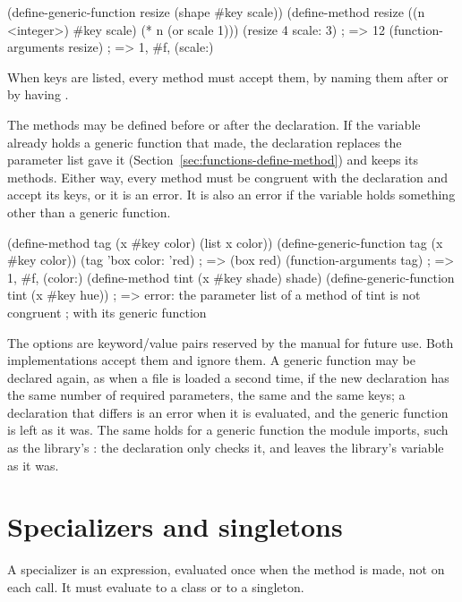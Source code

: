 \begin{dylan}
(define-generic-function resize (shape #key scale))
(define-method resize ((n <integer>) #key scale)
  (* n (or scale 1)))
(resize 4 scale: 3)            ; => 12
(function-arguments resize)    ; => 1, #f, (scale:)
\end{dylan}

\noindent When keys are listed, every method must accept them, by naming
them after  or by having .

The methods may be defined before or after the declaration. If the variable
already holds a generic function that  made, the
declaration replaces the parameter list  gave it
(Section~\ref{sec:functions-define-method}) and keeps its methods. Either
way, every method must be congruent with the declaration and accept its
keys, or it is an error. It is also an error if the variable holds something
other than a generic function.

\begin{dylan}
(define-method tag (x #key color) (list x color))
(define-generic-function tag (x #key color))
(tag 'box color: 'red)         ; => (box red)
(function-arguments tag)       ; => 1, #f, (color:)
(define-method tint (x #key shade) shade)
(define-generic-function tint (x #key hue))
; => error: the parameter list of a method of tint is not congruent
;    with its generic function
\end{dylan}

The options are keyword/value pairs reserved by the manual for future use.
Both implementations accept them and ignore them. A generic function may
be declared again, as when a file is loaded a second time, if the new
declaration has the same number of required parameters, the same
 and the same keys; a declaration that differs is an error
when it is evaluated, and the generic function is left as it was. The
same holds for a generic function the module imports, such as the
library's : the declaration only checks it, and leaves the
library's variable as it was.

\section{Specializers and singletons}\label{sec:functions-singletons}

A specializer is an expression, evaluated once when the method is made, not
on each call. It must evaluate to a class or to a singleton.

